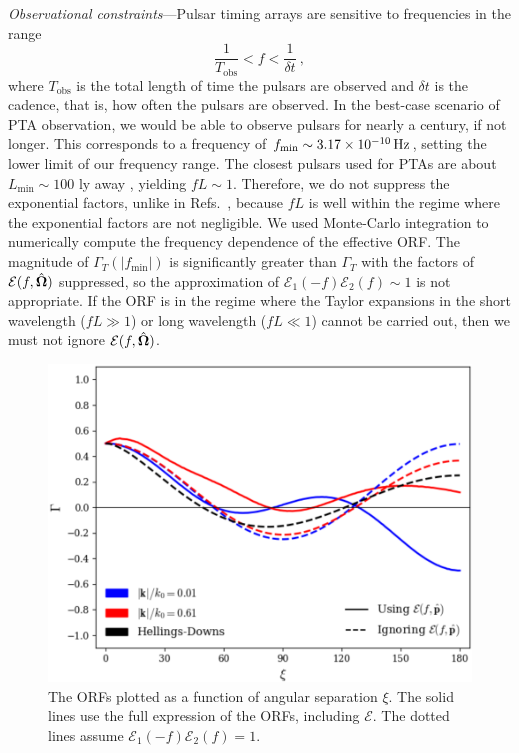 \documentclass[10pt,prd,twocolumn,aps,nofootinbib,nobibnotes,superscriptaddress,preprintnumbers]{revtex4-2}
\newcommand{\Hz}{\,{\rm Hz}}
\begin{document}
\textit{Observational constraints}---Pulsar timing arrays are sensitive to frequencies in the range \cite{Moore:2014lga}
\begin{equation}\label{eq:freqrange}
    \frac{1}{T_{\text{obs}}} < f < \frac{1}{\delta t}\ ,
\end{equation} 
where $T_{\text{obs}}$ is the total length of time the pulsars are observed and $\delta t$ is the cadence, that is, how often the pulsars are observed. In the best-case scenario of PTA observation, we would be able to observe pulsars for nearly a century, if not longer. This corresponds to a frequency of $f_{\text{min}} \sim 3.17 \times 10^{-10} \Hz$, setting the lower limit of our frequency range. The closest pulsars used for PTAs are about $L_{\text{min}} \sim 100$ ly away \cite{Anholm:2008wy}, yielding $fL \sim 1$. Therefore, we do not suppress the exponential factors, unlike in Refs.~\cite{Liang:2021bct,Arjona:2024cex}, because $fL$ is well within the regime where the exponential factors are not negligible.
We used Monte-Carlo integration to numerically compute the frequency dependence of the effective ORF. The magnitude of $\Gamma_T(|f_{\text{min}}|)$ is significantly greater than $\Gamma_T$ with the factors of $\mathcal{E}(f, \hat{\bf \Omega})$ suppressed, so the approximation of $\mathcal{E}_1(-f)\mathcal{E}_2(f) \sim 1$ is not appropriate. If the ORF is in the regime where the Taylor expansions in the short wavelength ($fL \gg 1$) or long wavelength ($fL \ll 1$) cannot be carried out, then we must not ignore $\mathcal{E}(f, \hat{\bf \Omega})$.
\begin{figure}[ht]
    \centering
    \includegraphics[scale=0.5]{fig1.pdf}
    \caption{The ORFs plotted as a function of angular separation $\xi$. The solid lines use the full expression of the ORFs, including $\mathcal{E}$. The dotted lines assume $\mathcal{E}_1(-f)\mathcal{E}_2(f)=1$.}
    \label{fig:orfs}
\end{figure}
\end{document}
